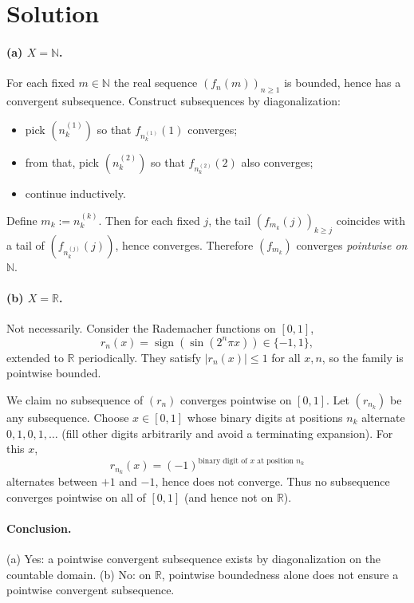 \documentclass[12pt,a4paper]{article}
\begin{document}
\section*{Solution}

\paragraph{(a) $X=\mathbb{N}$.}
For each fixed $m\in\mathbb{N}$ the real sequence $(f_n(m))_{n\ge1}$ is bounded, hence has a convergent subsequence.
Construct subsequences by diagonalization:
\begin{itemize}
	\item pick $(n^{(1)}_k)$ so that $f_{n^{(1)}_k}(1)$ converges;
	\item from that, pick $(n^{(2)}_k)$ so that $f_{n^{(2)}_k}(2)$ also converges;
	\item continue inductively.
\end{itemize}
Define $m_k:=n^{(k)}_k$. Then for each fixed $j$, the tail $(f_{m_k}(j))_{k\ge j}$ coincides with a tail of $(f_{n^{(j)}_k}(j))$, hence converges. Therefore $(f_{m_k})$ converges \emph{pointwise on $\mathbb{N}$}.

\paragraph{(b) $X=\mathbb{R}$.}
Not necessarily. Consider the Rademacher functions on $[0,1]$,
\[
r_n(x)=\operatorname{sign}(\sin(2^n\pi x))\in\{-1,1\},
\]
extended to $\mathbb{R}$ periodically. They satisfy $|r_n(x)|\le 1$ for all $x,n$, so the family is pointwise bounded.

We claim no subsequence of $(r_n)$ converges pointwise on $[0,1]$. Let $(r_{n_k})$ be any subsequence. Choose $x\in[0,1]$ whose binary digits at positions $n_k$ alternate $0,1,0,1,\dots$ (fill other digits arbitrarily and avoid a terminating expansion). For this $x$,
\[
r_{n_k}(x)=(-1)^{\text{binary digit of $x$ at position $n_k$}}
\]
alternates between $+1$ and $-1$, hence does not converge. Thus no subsequence converges pointwise on all of $[0,1]$ (and hence not on $\mathbb{R}$).

\paragraph{Conclusion.}
(a) Yes: a pointwise convergent subsequence exists by diagonalization on the countable domain.
(b) No: on $\mathbb{R}$, pointwise boundedness alone does not ensure a pointwise convergent subsequence.
\end{document}
